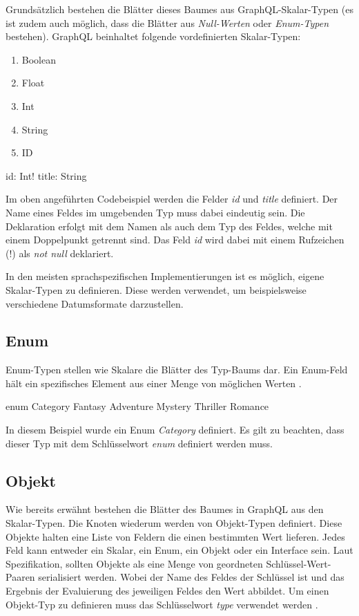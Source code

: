 Grundsätzlich bestehen die Blätter dieses Baumes aus GraphQL-Skalar-Typen (es ist zudem auch möglich, dass die Blätter aus \textit{Null-Werten} oder \textit{Enum-Typen} bestehen).
\cite[Abs. ScalarTypeDefinition]{graphqlOnline}
GraphQL beinhaltet folgende vordefinierten Skalar-Typen:
\begin{enumerate}
    \item Boolean
    \item Float
    \item Int
    \item String
    \item ID
\end{enumerate}

\begin{JsCode}
    id: Int!
    title: String
\end{JsCode}

Im oben angeführten Codebeispiel werden die Felder \textit{id} und \textit{title} definiert.
Der Name eines Feldes im umgebenden Typ muss dabei eindeutig sein.
Die Deklaration erfolgt mit dem Namen als auch dem Typ des Feldes, welche mit einem Doppelpunkt getrennt sind.
Das Feld \textit{id} wird dabei mit einem Rufzeichen (!) als \textit{not null} deklariert.



In den meisten sprachspezifischen Implementierungen ist es möglich, eigene Skalar-Typen zu definieren. Diese werden verwendet, um beispielsweise verschiedene Datumsformate darzustellen.

\subsection{Enum}

Enum-Typen stellen wie Skalare die Blätter des Typ-Baums dar.
Ein Enum-Feld hält ein spezifisches Element aus einer Menge von möglichen Werten
\cite[Abs. 3.9]{graphqlOnline}
\cite[S. 60-61]{kress2020graphql}.

\begin{JsCode}
enum Category {
    Fantasy
    Adventure
    Mystery
    Thriller
    Romance
}
\end{JsCode}

In diesem Beispiel wurde ein Enum \textit{Category} definiert.
Es gilt zu beachten, dass dieser Typ mit dem Schlüsselwort \textit{enum} definiert werden muss.

\subsection{Objekt}
Wie bereits erwähnt bestehen die Blätter des Baumes in GraphQL aus den Skalar-Typen.
Die Knoten wiederum werden von Objekt-Typen definiert.
Diese Objekte halten eine Liste von Feldern die einen bestimmten Wert lieferen.
Jedes Feld kann entweder ein Skalar, ein Enum, ein Objekt oder ein Interface sein.
Laut Spezifikation, sollten Objekte als eine Menge von geordneten Schlüssel-Wert-Paaren serialisiert werden.
Wobei der Name des Feldes der Schlüssel ist und das Ergebnis der Evaluierung des jeweiligen Feldes den Wert abbildet.
Um einen Objekt-Typ zu definieren muss das Schlüsselwort \textit{type} verwendet werden
\cite[Abs. 3.6]{graphqlOnline}.

